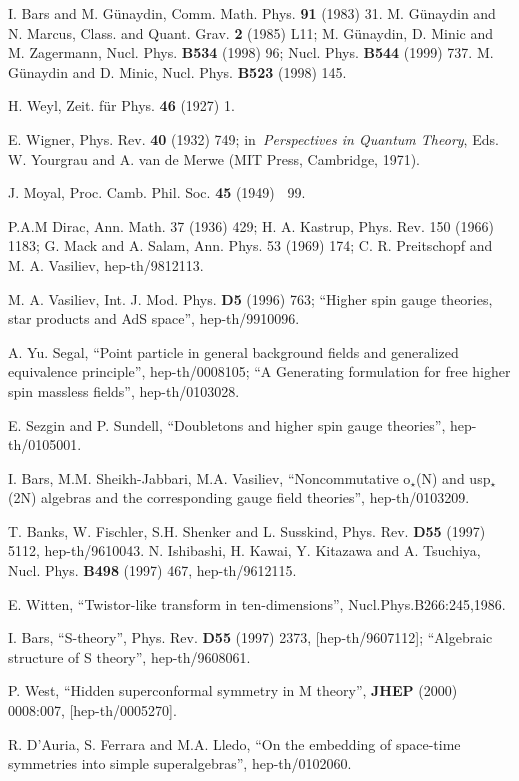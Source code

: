 \documentclass[a4paper,12pt]{article}
\begin{document}
\begin{thebibliography}{99}
  I. Bars and M. G\"{u}naydin, Comm. Math. Phys.
\textbf{91 }(1983) 31. M. G\"{u}naydin and N. Marcus, Class. and Quant.
Grav. \textbf{2 }(1985) L11; M. G\"{u}naydin, D. Minic and M. Zagermann,
Nucl. Phys. \textbf{B534 }(1998) 96; Nucl. Phys. \textbf{B544 }(1999) 737.
M. G\"{u}naydin and D. Minic, Nucl. Phys. \textbf{B523 }(1998) 145.

  H. Weyl, Zeit. f\"ur Phys. \textbf{46} (1927) 1.

  E. Wigner, Phys. Rev. \textbf{40} (1932) 749; in\textit{\
Perspectives in Quantum Theory}, Eds. W. Yourgrau and A. van de Merwe (MIT
Press, Cambridge, 1971).

  J. Moyal, Proc. Camb. Phil. Soc. \textbf{45 }(1949)\textbf{%
\ }99.

  P.A.M Dirac, Ann. Math. 37 (1936) 429; H. A. Kastrup, Phys.
Rev. 150 (1966) 1183; G. Mack and A. Salam, Ann. Phys. 53 (1969) 174; C. R.
Preitschopf and M. A. Vasiliev, hep-th/9812113.

  M. A. Vasiliev, Int. J. Mod. Phys. \textbf{D5 }(1996) 763;
``Higher spin gauge theories, star products and AdS space'', hep-th/9910096.

  A. Yu. Segal, ``Point particle in general background fields
and generalized equivalence principle'', hep-th/0008105; ``A Generating
formulation for free higher spin massless fields'', hep-th/0103028.

  E. Sezgin and P. Sundell, ``Doubletons and higher spin
gauge theories'', hep-th/0105001.

  I. Bars, M.M. Sheikh-Jabbari, M.A. Vasiliev,
``Noncommutative o$_{\star }$(N) and usp$_{\star }$(2N) algebras and the
corresponding gauge field theories'', hep-th/0103209.

  T. Banks, W. Fischler, S.H. Shenker and L. Susskind, Phys.
Rev. \textbf{D55} (1997) 5112, hep-th/9610043.
N. Ishibashi, H. Kawai, Y. Kitazawa and A. Tsuchiya, Nucl. Phys. \textbf{B498%
} (1997) 467, hep-th/9612115.

  E. Witten, ``Twistor-like transform in ten-dimensions'',
Nucl.Phys.B266:245,1986.

  I. Bars, ``S-theory'', Phys. Rev. \textbf{D55} (1997)
2373, [hep-th/9607112]; ``Algebraic structure of S theory'', hep-th/9608061.

  P. West, ``Hidden superconformal symmetry in M theory'',
\textbf{JHEP} (2000) 0008:007, [hep-th/0005270].

  R. D'Auria, S. Ferrara and M.A. Lledo, ``On the embedding
of space-time symmetries into simple superalgebras'', hep-th/0102060.
\end{thebibliography}
\end{document}
